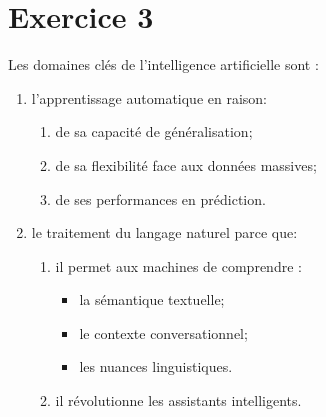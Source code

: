 \documentclass[12pt,a4paper]{article}
\begin{document}
\section*{Exercice 3}
Les domaines clés de l'intelligence artificielle sont :
\begin{enumerate}
    \item l'apprentissage automatique en raison:
    \begin{enumerate}
        \item de sa capacité de généralisation;
        \item de sa flexibilité face aux données massives;
        \item de ses performances en prédiction.
    \end{enumerate}
    \item le traitement du langage naturel parce que:
    \begin{enumerate}
        \item il permet aux machines de comprendre :
        \begin{itemize}[label=---]
            \item la sémantique textuelle;
            \item le contexte conversationnel;
            \item les nuances linguistiques.
        \end{itemize}
        \item il révolutionne les assistants intelligents.
    \end{enumerate}
\end{enumerate}
\end{document}
